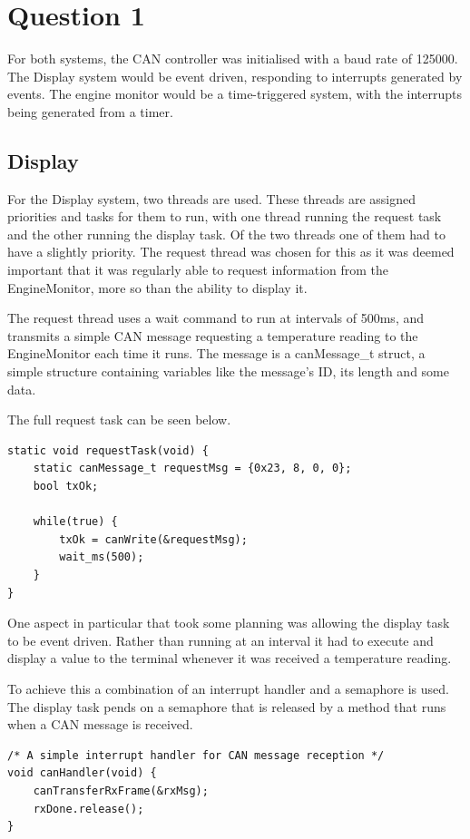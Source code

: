 \documentclass[]{report}
\begin{document}
		\section{Question 1}
		For both systems, the CAN controller was initialised with a baud rate of 125000. The Display system would be event driven, responding to interrupts generated by events. The engine monitor would be a time-triggered system, with the interrupts being generated from a timer.
			
			\subsection{Display}
			For the Display system, two threads are used. These threads are assigned priorities and tasks for them to run, with one thread running the request task and the other running the display task. Of the two threads one of them had to have a slightly priority. The request thread was chosen for this as it was deemed important that it was regularly able to request information from the EngineMonitor, more so than the ability to display it. 
			
			The request thread uses a wait command to run at intervals of 500ms, and transmits a simple CAN message requesting a temperature reading to the EngineMonitor each time it runs. The message is a canMessage\_t struct, a simple structure containing variables like the message's ID, its length and some data.
			
			The full request task can be seen below.
			
\begin{lstlisting}
static void requestTask(void) {
	static canMessage_t requestMsg = {0x23, 8, 0, 0};
	bool txOk;
				
	while(true) {
		txOk = canWrite(&requestMsg);
		wait_ms(500);
	}
}
\end{lstlisting}			
			One aspect in particular that took some planning was allowing the display task to be event driven. Rather than running at an interval it had to execute and display a value to the terminal whenever it was received a temperature reading.
			
			To achieve this a combination of an interrupt handler and a semaphore is used. The display task pends on a semaphore that is released by a method that runs when a CAN message is received.
			
\begin{lstlisting}
/* A simple interrupt handler for CAN message reception */
void canHandler(void) {
	canTransferRxFrame(&rxMsg);
	rxDone.release();
}
\end{lstlisting}
\end{document}
